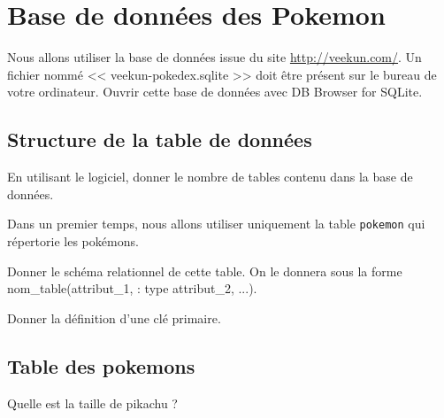 
\section*{Base de données des Pokemon}
\label{sec:bdd}

Nous allons utiliser la base de données issue du site \url{http://veekun.com/}. Un fichier nommé << veekun-pokedex.sqlite >> doit être présent sur le bureau de votre ordinateur. Ouvrir cette base de données avec DB Browser for SQLite.


%

\subsection*{Structure de la table de données}

\question{}
En utilisant le logiciel, donner le nombre de tables contenu dans la base de données. 


Dans un premier temps, nous allons utiliser uniquement la table \texttt{pokemon} qui répertorie les pokémons.

\question{}
Donner le schéma relationnel de cette table. On le donnera sous la forme nom\_table(attribut\_1, : type attribut_2, ...).

\question{}
Donner la définition d'une clé primaire.

\subsection*{Table des pokemons}



\question{}
Quelle est la taille de pikachu ?

